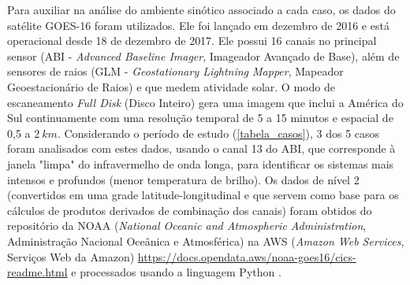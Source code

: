 Para auxiliar na análise do ambiente sinótico associado a cada caso, os dados do satélite GOES-16 foram utilizados. Ele foi lançado em dezembro de 2016 e está operacional desde 18 de dezembro de 2017. Ele possui 16 canais no principal sensor (ABI - \textit{Advanced Baseline Imager}, Imageador Avançado de Base), além de sensores de raios (GLM - \textit{Geostationary Lightning Mapper}, Mapeador Geoestacionário de Raios) e que medem atividade solar. O modo de escaneamento \textit{Full Disk} (Disco Inteiro) gera uma imagem que inclui a América do Sul continuamente com uma resolução temporal de 5 a 15 minutos e espacial de 0,5 a $2\:km$. Considerando o período de estudo (\autoref{tabela_casos}), 3 dos 5 casos foram analisados com estes dados, usando o canal 13 do ABI, que corresponde à janela "limpa" do infravermelho de onda longa, para identificar os sistemas mais intensos e profundos (menor temperatura de brilho). Os dados de nível 2 (convertidos em uma grade latitude-longitudinal e que servem como base para os cálculos de produtos derivados de combinação dos canais) foram obtidos do repositório da NOAA (\textit{National Oceanic and Atmospheric Administration}, Administração Nacional Oceânica e Atmosférica) na AWS (\textit{Amazon Web Services}, Serviços Web da Amazon) \url{https://docs.opendata.aws/noaa-goes16/cics-readme.html} e processados usando a linguagem Python \cite{Python2018}.